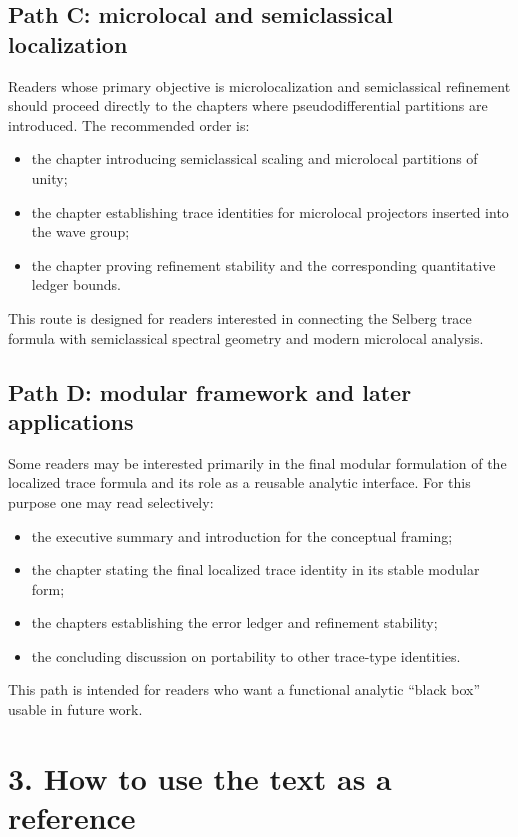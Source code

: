 \subsection*{Path C: microlocal and semiclassical localization}

\noindent
Readers whose primary objective is microlocalization and semiclassical refinement should proceed directly to the chapters where pseudodifferential partitions are introduced.
The recommended order is:
\begin{itemize}
  \item the chapter introducing semiclassical scaling and microlocal partitions of unity;
  \item the chapter establishing trace identities for microlocal projectors inserted into the wave group;
  \item the chapter proving refinement stability and the corresponding quantitative ledger bounds.
\end{itemize}
This route is designed for readers interested in connecting the Selberg trace formula with semiclassical spectral geometry and modern microlocal analysis.

\subsection*{Path D: modular framework and later applications}

\noindent
Some readers may be interested primarily in the final modular formulation of the localized trace formula and its role as a reusable analytic interface.
For this purpose one may read selectively:
\begin{itemize}
  \item the executive summary and introduction for the conceptual framing;
  \item the chapter stating the final localized trace identity in its stable modular form;
  \item the chapters establishing the error ledger and refinement stability;
  \item the concluding discussion on portability to other trace-type identities.
\end{itemize}
This path is intended for readers who want a functional analytic ``black box'' usable in future work.

\section*{3. How to use the text as a reference}

